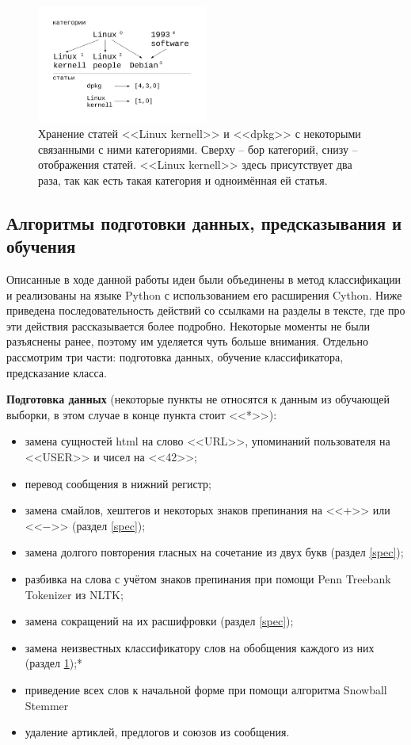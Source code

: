 \begin{figure}
  \centering
  \includegraphics[width=0.5\textwidth]{ontology}
  \caption{Хранение статей <<Linux kernell>> и <<dpkg>> с некоторыми связанными с ними категориями.
Сверху -- бор категорий, снизу -- отображения статей. <<Linux kernell>> здесь
присутствует два раза, так как есть такая категория и одноимённая ей статья.}\label{ontology}
\end{figure}

\subsection{Алгоритмы подготовки данных, предсказывания и обучения}
Описанные в ходе данной работы идеи были объединены в метод классификации
и реализованы на языке Python с использованием его расширения Cython. Ниже
приведена последовательность действий со ссылками на разделы в тексте, где про эти действия
рассказывается более подробно. Некоторые моменты не были разъяснены ранее, поэтому им уделяется чуть
больше внимания. Отдельно рассмотрим три части: подготовка данных, обучение классификатора,
предсказание класса.

\textbf{Подготовка данных} (некоторые пункты не относятся к данным из обучающей выборки, в этом
случае в конце пункта стоит <<*>>):
\begin{itemize}
  \setlength{\itemsep}{1pt}%
    \setlength{\parskip}{1pt}
  \item замена сущностей html на слово <<URL>>, упоминаний пользователя на <<USER>> и чисел на <<42>>;
  \item перевод сообщения в нижний регистр;
  \item замена смайлов, хештегов и некоторых знаков препинания на <<+>> или <<$\minus$>> (раздел \ref{spec});
  \item замена долгого повторения гласных на сочетание из двух букв (раздел \ref{spec});
  \item разбивка на слова с учётом знаков препинания при помощи Penn Treebank Tokenizer из NLTK\cite{bird2006nltk};
  \item замена сокращений на их расшифровки (раздел \ref{spec});
  \item замена неизвестных классификатору слов на обобщения каждого из них (раздел \ref{ontology});*
  \item приведение всех слов к начальной форме при помощи алгоритма Snowball
  Stemmer\cite{porter2001snowball}
  \item удаление артиклей, предлогов и союзов из сообщения.
\end{itemize}

